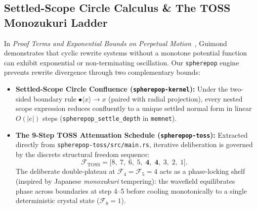 \documentclass[10pt,twocolumn,letterpaper]{article}
\begin{document}
\subsection{Settled-Scope Circle Calculus \& The TOSS Monozukuri Ladder}
In \emph{Proof Terms and Exponential Bounds on Perpetual Motion}~\cite{guimond2026perpetual}, Guimond demonstrates that cyclic rewrite systems without a monotone potential function can exhibit exponential or non-terminating oscillation. Our \texttt{spherepop} engine prevents rewrite divergence through two complementary bounds:
\begin{itemize}[leftmargin=1.4em,itemsep=1pt,topsep=2pt]
    \item \textbf{Settled-Scope Circle Confluence (\texttt{spherepop-kernel}):} Under the two-sided boundary rule $\bullet\langle x \rangle \to x$ (paired with radial projection), every nested scope expression reduces confluently to a unique settled normal form in linear $O(|e|)$ steps (\texttt{spherepop\_settle\_depth} in \texttt{memnet}).
    \item \textbf{The 9-Step TOSS Attenuation Schedule (\texttt{spherepop-toss}):} Extracted directly from \texttt{spherepop-toss/src/main.rs}, iterative deliberation is governed by the discrete structural freedom sequence:
    \begin{equation}
        \mathcal{F}_{\text{TOSS}} = \bigl[8,\; 7,\; 6,\; 5,\; \mathbf{4},\; \mathbf{4},\; 3,\; 2,\; 1\bigr].
    \end{equation}
    The deliberate double-plateau at $\mathcal{F}_4 = \mathcal{F}_5 = 4$ acts as a phase-locking shelf (inspired by Japanese \emph{monozukuri} tempering): the wavefield equilibrates phase across boundaries at step 4--5 before cooling monotonically to a single deterministic crystal state ($\mathcal{F}_8 = 1$).
\end{itemize}
\end{document}
